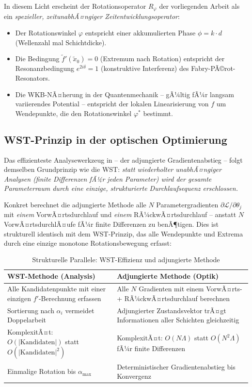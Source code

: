 ﻿\documentclass[12pt, a4paper]{article}
\theoremstyle{definition}
\begin{document}
	In diesem Licht erscheint der Rotationsoperator $R_\varphi$ der vorliegenden
	Arbeit als ein \emph{spezieller, zeitunabhÃ¤ngiger Zeitentwicklungsoperator}:
	\begin{itemize}
		\item Der Rotationswinkel $\varphi$ entspricht einer akkumulierten Phase
		$\phi = k \cdot d$ (Wellenzahl mal Schichtdicke).
		\item Die Bedingung $\tilde{f}'(\tilde{x}_0) = 0$ (Extremum nach Rotation)
		entspricht der Resonanzbedingung $e^{2i\delta} = 1$ (konstruktive
		Interferenz) des Fabry-PÃ©rot-Resonators.
		\item Die WKB-NÃ¤herung in der Quantenmechanik -- gÃ¼ltig fÃ¼r langsam
		variierendes Potential -- entspricht der lokalen Linearisierung
		von $f$ um Wendepunkte, die den Rotationswinkel $\varphi^*$ bestimmt.
	\end{itemize}
	
	\subsection{WST-Prinzip in der optischen Optimierung}
	
	Das effizienteste Analysewerkzeug in \cite{oqtum} -- der adjungierte
	Gradientenabstieg -- folgt demselben Grundprinzip wie die WST:
	\emph{statt wiederholter unabhÃ¤ngiger Analysen (finite Differenzen fÃ¼r
		jeden Parameter) wird der gesamte Parameterraum durch eine einzige,
		strukturierte Durchlaufsequenz erschlossen.}
	
	Konkret berechnet die adjungierte Methode alle $N$ Parametergradienten
	$\partial\mathcal{L}/\partial\theta_j$ mit \emph{einem} VorwÃ¤rtsdurchlauf
	und \emph{einem} RÃ¼ckwÃ¤rtsdurchlauf -- anstatt $N$ VorwÃ¤rtsdurchlÃ¤ufe
	fÃ¼r finite Differenzen zu benÃ¶tigen. Dies ist strukturell identisch mit
	dem WST-Prinzip, das alle Wendepunkte und Extrema durch eine einzige
	monotone Rotationsbewegung erfasst:
	
	\begin{table}[H]
		\centering
		\caption{Strukturelle Parallele: WST-Effizienz und adjungierte Methode}
		\renewcommand{\arraystretch}{1.4}
		\begin{tabular}{p{6.5cm} p{6.5cm}}
			\toprule
			\textbf{WST-Methode (Analysis)} & \textbf{Adjungierte Methode (Optik)} \\
			\midrule
			Alle Kandidatenpunkte mit einer einzigen $f'$-Berechnung erfassen &
			Alle $N$ Gradienten mit einem VorwÃ¤rts- + RÃ¼ckwÃ¤rtsdurchlauf berechnen \\[4pt]
			Sortierung nach $\alpha_i$ vermeidet Doppelarbeit &
			Adjungierter Zustandsvektor trÃ¤gt Informationen aller Schichten gleichzeitig \\[4pt]
			KomplexitÃ¤t: $O(|\text{Kandidaten}|)$ statt $O(|\text{Kandidaten}|^2)$ &
			KomplexitÃ¤t: $O(N\Lambda)$ statt $O(N^2\Lambda)$ fÃ¼r finite Differenzen \\[4pt]
			Einmalige Rotation bis $\alpha_\mathrm{max}$ &
			Deterministischer Gradientenabstieg bis Konvergenz \\
			\bottomrule
		\end{tabular}
	\end{table}
	
\end{document}
